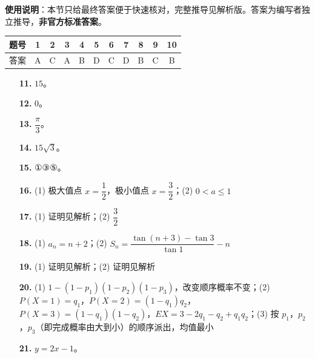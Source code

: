
\begin{gknotice}
\textbf{使用说明}：本节只给最终答案便于快速核对，完整推导见解析版。答案为编写者独立推导，\textbf{非官方标准答案}。
\end{gknotice}

\begin{center}\begin{tabular}{ccccccccccc}
\toprule
题号 & 1 & 2 & 3 & 4 & 5 & 6 & 7 & 8 & 9 & 10 \\
\midrule
答案 & A & C & A & B & D & C & D & B & C & B \\
\bottomrule
\end{tabular}\end{center}

\begin{itemize}[leftmargin=2.6em]
  \item[\textbf{11.}] $15$。
  \item[\textbf{12.}] $0$。
  \item[\textbf{13.}] $\dfrac{\pi}{3}$。
  \item[\textbf{14.}] $15\sqrt3$。
  \item[\textbf{15.}] ①③⑤。
\end{itemize}

\begin{itemize}[leftmargin=2.6em]
  \item[\textbf{16.}] (1) 极大值点 $x=\dfrac12$，极小值点 $x=\dfrac32$；(2) $0<a\leqslant1$
  \item[\textbf{17.}] (1) 证明见解析；(2) $\dfrac32$
  \item[\textbf{18.}] (1) $a_n=n+2$；(2) $S_n=\dfrac{\tan(n+3)-\tan3}{\tan1}-n$
  \item[\textbf{19.}] (1) 证明见解析；(2) 证明见解析
  \item[\textbf{20.}] (1) $1-(1-p_1)(1-p_2)(1-p_3)$，改变顺序概率不变；(2) $P(X=1)=q_1$，$P(X=2)=(1-q_1)q_2$，$P(X=3)=(1-q_1)(1-q_2)$，$EX=3-2q_1-q_2+q_1q_2$；(3) 按 $p_1$，$p_2$，$p_3$（即完成概率由大到小）的顺序派出，均值最小
  \item[\textbf{21.}] $y=2x-1$。
\end{itemize}
